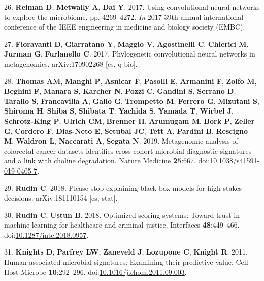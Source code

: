 \documentclass[11pt,]{article}
\begin{document}
\hypertarget{ref-reiman_using_2017}{}
26. \textbf{Reiman D}, \textbf{Metwally A}, \textbf{Dai Y}. 2017. Using
convolutional neural networks to explore the microbiome, pp. 4269--4272.
\emph{In} 2017 39th annual international conference of the IEEE
engineering in medicine and biology society (EMBC).

\hypertarget{ref-fioravanti_phylogenetic_2017}{}
27. \textbf{Fioravanti D}, \textbf{Giarratano Y}, \textbf{Maggio V},
\textbf{Agostinelli C}, \textbf{Chierici M}, \textbf{Jurman G},
\textbf{Furlanello C}. 2017. Phylogenetic convolutional neural networks
in metagenomics. arXiv:170902268 {[}cs, q-bio{]}.

\hypertarget{ref-thomas_metagenomic_2019}{}
28. \textbf{Thomas AM}, \textbf{Manghi P}, \textbf{Asnicar F},
\textbf{Pasolli E}, \textbf{Armanini F}, \textbf{Zolfo M},
\textbf{Beghini F}, \textbf{Manara S}, \textbf{Karcher N}, \textbf{Pozzi
C}, \textbf{Gandini S}, \textbf{Serrano D}, \textbf{Tarallo S},
\textbf{Francavilla A}, \textbf{Gallo G}, \textbf{Trompetto M},
\textbf{Ferrero G}, \textbf{Mizutani S}, \textbf{Shiroma H},
\textbf{Shiba S}, \textbf{Shibata T}, \textbf{Yachida S}, \textbf{Yamada
T}, \textbf{Wirbel J}, \textbf{Schrotz-King P}, \textbf{Ulrich CM},
\textbf{Brenner H}, \textbf{Arumugam M}, \textbf{Bork P}, \textbf{Zeller
G}, \textbf{Cordero F}, \textbf{Dias-Neto E}, \textbf{Setubal JC},
\textbf{Tett A}, \textbf{Pardini B}, \textbf{Rescigno M},
\textbf{Waldron L}, \textbf{Naccarati A}, \textbf{Segata N}. 2019.
Metagenomic analysis of colorectal cancer datasets identifies
cross-cohort microbial diagnostic signatures and a link with choline
degradation. Nature Medicine \textbf{25}:667.
doi:\href{https://doi.org/10.1038/s41591-019-0405-7}{10.1038/s41591-019-0405-7}.

\hypertarget{ref-rudin_please_2018}{}
29. \textbf{Rudin C}. 2018. Please stop explaining black box models for
high stakes decisions. arXiv:181110154 {[}cs, stat{]}.

\hypertarget{ref-rudin_optimized_2018}{}
30. \textbf{Rudin C}, \textbf{Ustun B}. 2018. Optimized scoring systems:
Toward trust in machine learning for healthcare and criminal justice.
Interfaces \textbf{48}:449--466.
doi:\href{https://doi.org/10.1287/inte.2018.0957}{10.1287/inte.2018.0957}.

\hypertarget{ref-knights_human-associated_2011}{}
31. \textbf{Knights D}, \textbf{Parfrey LW}, \textbf{Zaneveld J},
\textbf{Lozupone C}, \textbf{Knight R}. 2011. Human-associated microbial
signatures: Examining their predictive value. Cell Host Microbe
\textbf{10}:292--296.
doi:\href{https://doi.org/10.1016/j.chom.2011.09.003}{10.1016/j.chom.2011.09.003}.
\end{document}

